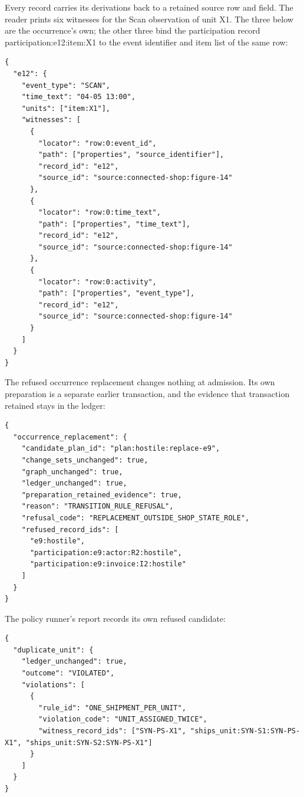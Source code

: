 \par\medskip
\noindent\begin{minipage}{\linewidth}
Every record carries its derivations back to a retained source row and field. The reader prints six witnesses for the Scan observation of unit X1. The three below are the occurrence's own; the other three bind the participation record participation:e12:item:X1 to the event identifier and item list of the same row:

\begin{lstlisting}
{
  "e12": {
    "event_type": "SCAN",
    "time_text": "04-05 13:00",
    "units": ["item:X1"],
    "witnesses": [
      {
        "locator": "row:0:event_id",
        "path": ["properties", "source_identifier"],
        "record_id": "e12",
        "source_id": "source:connected-shop:figure-14"
      },
      {
        "locator": "row:0:time_text",
        "path": ["properties", "time_text"],
        "record_id": "e12",
        "source_id": "source:connected-shop:figure-14"
      },
      {
        "locator": "row:0:activity",
        "path": ["properties", "event_type"],
        "record_id": "e12",
        "source_id": "source:connected-shop:figure-14"
      }
    ]
  }
}
\end{lstlisting}
\end{minipage}\par\medskip

\par\medskip
\noindent\begin{minipage}{\linewidth}
The refused occurrence replacement changes nothing at admission. Its own preparation is a separate earlier transaction, and the evidence that transaction retained stays in the ledger:

\begin{lstlisting}
{
  "occurrence_replacement": {
    "candidate_plan_id": "plan:hostile:replace-e9",
    "change_sets_unchanged": true,
    "graph_unchanged": true,
    "ledger_unchanged": true,
    "preparation_retained_evidence": true,
    "reason": "TRANSITION_RULE_REFUSAL",
    "refusal_code": "REPLACEMENT_OUTSIDE_SHOP_STATE_ROLE",
    "refused_record_ids": [
      "e9:hostile",
      "participation:e9:actor:R2:hostile",
      "participation:e9:invoice:I2:hostile"
    ]
  }
}
\end{lstlisting}
\end{minipage}\par\medskip

\par\medskip
\noindent\begin{minipage}{\linewidth}
The policy runner's report records its own refused candidate:

\begin{lstlisting}
{
  "duplicate_unit": {
    "ledger_unchanged": true,
    "outcome": "VIOLATED",
    "violations": [
      {
        "rule_id": "ONE_SHIPMENT_PER_UNIT",
        "violation_code": "UNIT_ASSIGNED_TWICE",
        "witness_record_ids": ["SYN-PS-X1", "ships_unit:SYN-S1:SYN-PS-X1", "ships_unit:SYN-S2:SYN-PS-X1"]
      }
    ]
  }
}
\end{lstlisting}
\end{minipage}\par\medskip

